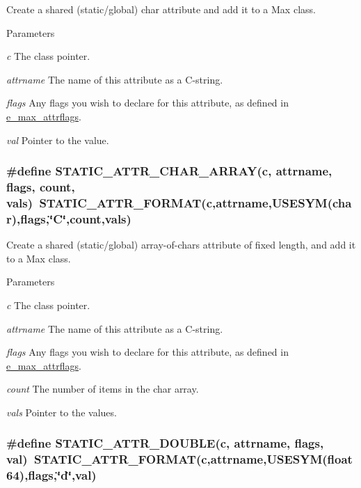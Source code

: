 Create a shared (static/global) char attribute and add it to a Max class. 
\begin{DoxyParams}{Parameters}
\item[{\em c}]The class pointer. \item[{\em attrname}]The name of this attribute as a C-\/string. \item[{\em flags}]Any flags you wish to declare for this attribute, as defined in \hyperlink{group__attr_gaf296cfc6741bb19207f6ed8062809115}{e\_\-max\_\-attrflags}. \item[{\em val}]Pointer to the value. \end{DoxyParams}
\hypertarget{group__attr_gaf3fb04659d50f1c0eb0ed8f821a9a355}{
\subsubsection[{STATIC\_\-ATTR\_\-CHAR\_\-ARRAY}]{\setlength{\rightskip}{0pt plus 5cm}\#define STATIC\_\-ATTR\_\-CHAR\_\-ARRAY(c, \/  attrname, \/  flags, \/  count, \/  vals)~STATIC\_\-ATTR\_\-FORMAT(c,attrname,USESYM(char),flags,\char`\"{}C\char`\"{},count,vals)}}
\label{group__attr_gaf3fb04659d50f1c0eb0ed8f821a9a355}


Create a shared (static/global) array-\/of-\/chars attribute of fixed length, and add it to a Max class. 
\begin{DoxyParams}{Parameters}
\item[{\em c}]The class pointer. \item[{\em attrname}]The name of this attribute as a C-\/string. \item[{\em flags}]Any flags you wish to declare for this attribute, as defined in \hyperlink{group__attr_gaf296cfc6741bb19207f6ed8062809115}{e\_\-max\_\-attrflags}. \item[{\em count}]The number of items in the char array. \item[{\em vals}]Pointer to the values. \end{DoxyParams}
\hypertarget{group__attr_ga10c4eeafd211a5228352eaa12af6d2ce}{
\subsubsection[{STATIC\_\-ATTR\_\-DOUBLE}]{\setlength{\rightskip}{0pt plus 5cm}\#define STATIC\_\-ATTR\_\-DOUBLE(c, \/  attrname, \/  flags, \/  val)~STATIC\_\-ATTR\_\-FORMAT(c,attrname,USESYM(float64),flags,\char`\"{}d\char`\"{},val)}}
\label{group__attr_ga10c4eeafd211a5228352eaa12af6d2ce}


